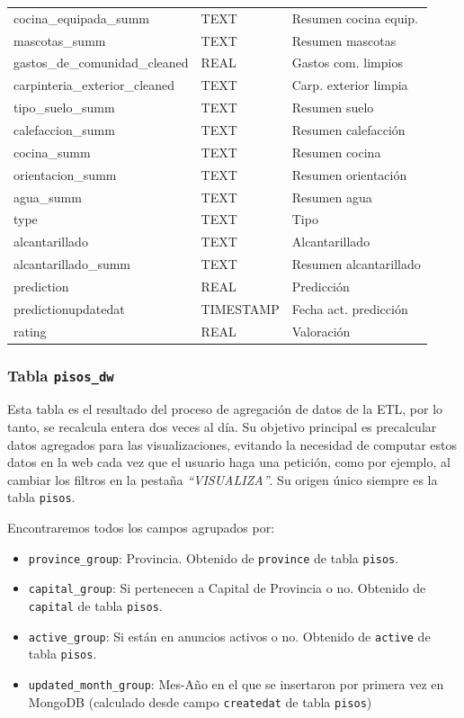 \begin{longtable}{lll}
cocina\_equipada\_summ & TEXT & Resumen cocina equip. \\
mascotas\_summ & TEXT & Resumen mascotas \\
gastos\_de\_comunidad\_cleaned & REAL & Gastos com. limpios \\
carpinteria\_exterior\_cleaned & TEXT & Carp. exterior limpia \\
tipo\_suelo\_summ & TEXT & Resumen suelo \\
calefaccion\_summ & TEXT & Resumen calefacción \\
cocina\_summ & TEXT & Resumen cocina \\
orientacion\_summ & TEXT & Resumen orientación \\
agua\_summ & TEXT & Resumen agua \\
type & TEXT & Tipo \\
alcantarillado & TEXT & Alcantarillado \\
alcantarillado\_summ & TEXT & Resumen alcantarillado \\
prediction & REAL & Predicción \\
predictionupdatedat & TIMESTAMP & Fecha act. predicción \\
rating & REAL & Valoración \\
\end{longtable}
    
\subsubsection{Tabla \texttt{pisos\_dw}}{\label{subsec:pisos_dw}}

Esta tabla es el resultado del proceso de agregación de datos de la ETL, por lo tanto, se recalcula entera dos veces al día. Su objetivo principal es precalcular datos agregados para las visualizaciones, evitando la necesidad de computar estos datos en la web cada vez que el usuario haga una petición, como por ejemplo, al cambiar los filtros en la pestaña \textit{``VISUALIZA''}. Su origen único siempre es la tabla \texttt{pisos}.

Encontraremos todos los campos agrupados por:

\begin{itemize}
    \item \texttt{province\_group}: Provincia. Obtenido de \texttt{province} de tabla \texttt{pisos}.
    \item \texttt{capital\_group}: Si pertenecen a Capital de Provincia o no. Obtenido de \texttt{capital} de tabla \texttt{pisos}.
    \item \texttt{active\_group}: Si están en anuncios activos o no. Obtenido de \texttt{active} de tabla \texttt{pisos}.
    \item \texttt{updated\_month\_group}:  Mes-Año en el que se insertaron por primera vez en MongoDB (calculado desde campo \texttt{createdat} de tabla \texttt{pisos})
\end{itemize}

